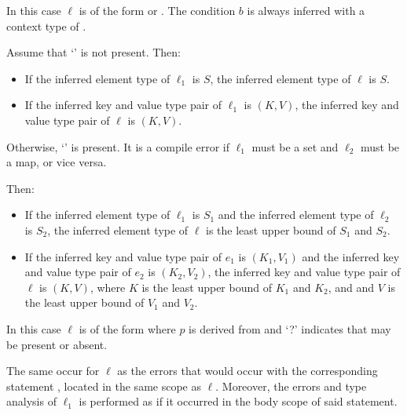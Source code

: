 \documentclass[makeidx]{article}
\begin{document}
{\LMHash{}%
%
In this case $\ell$ is of the form
 or
.
The condition $b$ is always inferred with a context type of .

\LMHash{}%
Assume that `' is not present. Then:
\begin{itemize}
\item
  If the inferred element type of $\ell_1$ is $S$,
  the inferred element type of $\ell$ is $S$.
\item
  If the inferred key and value type pair of $\ell_1$ is $(K, V)$,
  the inferred key and value type pair of $\ell$ is $(K, V)$.
\end{itemize}

\LMHash{}%
Otherwise, `' is present.
It is a compile error if $\ell_1$ must be a set and $\ell_2$ must be a map,
or vice versa.


\LMHash{}%
Then:

\begin{itemize}
\item
  If the inferred element type of $\ell_1$ is $S_1$ and
  the inferred element type of $\ell_2$ is $S_2$,
  the inferred element type of $\ell$ is
  the least upper bound of $S_1$ and $S_2$.
\item
  If the inferred key and value type pair of $e_1$ is
  $(K_1, V_1)$
  and the inferred key and value type pair of $e_2$ is
  $(K_2, V_2)$,
  the inferred key and value type pair of $\ell$ is
  $(K, V)$,
  where $K$ is the least upper bound of $K_1$ and $K_2$, and
  and $V$ is the least upper bound of $V_1$ and $V_2$.
\end{itemize}
\vspace{-5mm}
\EndCase

\LMHash{}%
%
In this case $\ell$ is of the form
where $p$ is derived from  and
`\AWAIT?' indicates that \AWAIT{} may be present or absent.

\LMHash{}%
The same  occur for $\ell$ as
the errors that would occur with the corresponding \FOR{} statement
,
located in the same scope as $\ell$.
Moreover, the errors and type analysis of $\ell_1$ is performed
as if it occurred in the body scope of said \FOR{} statement.

}
\end{document}
